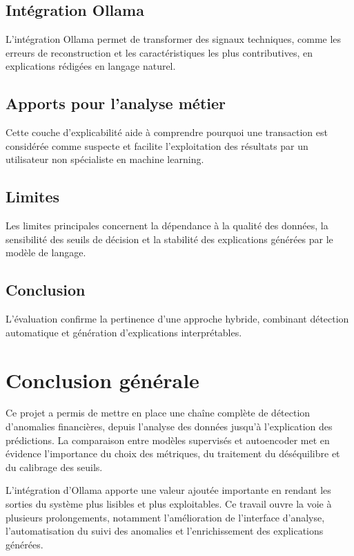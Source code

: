 \documentclass[12pt,a4paper,twoside]{report}
\begin{document}
\section{Intégration Ollama}
L'intégration Ollama permet de transformer des signaux techniques, comme les erreurs de reconstruction et les caractéristiques les plus contributives, en explications rédigées en langage naturel.

\section{Apports pour l'analyse métier}
Cette couche d'explicabilité aide à comprendre pourquoi une transaction est considérée comme suspecte et facilite l'exploitation des résultats par un utilisateur non spécialiste en machine learning.

\section{Limites}
Les limites principales concernent la dépendance à la qualité des données, la sensibilité des seuils de décision et la stabilité des explications générées par le modèle de langage.

\section{Conclusion}
L'évaluation confirme la pertinence d'une approche hybride, combinant détection automatique et génération d'explications interprétables.

\chapter*{Conclusion générale}

Ce projet a permis de mettre en place une chaîne complète de détection d'anomalies financières, depuis l'analyse des données jusqu'à l'explication des prédictions. La comparaison entre modèles supervisés et autoencoder met en évidence l'importance du choix des métriques, du traitement du déséquilibre et du calibrage des seuils.

L'intégration d'Ollama apporte une valeur ajoutée importante en rendant les sorties du système plus lisibles et plus exploitables. Ce travail ouvre la voie à plusieurs prolongements, notamment l'amélioration de l'interface d'analyse, l'automatisation du suivi des anomalies et l'enrichissement des explications générées.
\end{document}
